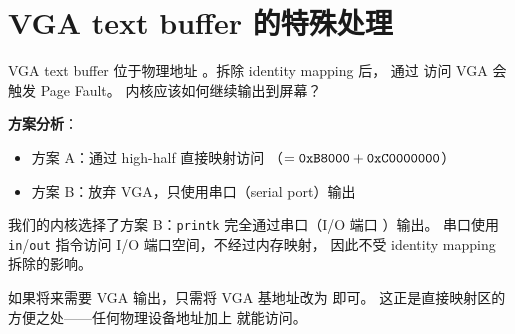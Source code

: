 \section{VGA text buffer 的特殊处理}

\begin{thinkbox}
VGA text buffer 位于物理地址 。拆除 identity mapping 后，
通过  访问 VGA 会触发 Page Fault。
内核应该如何继续输出到屏幕？

\textbf{方案分析}：
\begin{itemize}
  \item 方案 A：通过 high-half 直接映射访问 
        （$= \texttt{0xB8000} + \texttt{0xC0000000}$）
  \item 方案 B：放弃 VGA，只使用串口（serial port）输出
\end{itemize}

我们的内核选择了方案 B：\texttt{printk} 完全通过串口（I/O 端口 ）输出。
串口使用 \texttt{in}/\texttt{out} 指令访问 I/O 端口空间，不经过内存映射，
因此不受 identity mapping 拆除的影响。

如果将来需要 VGA 输出，只需将 VGA 基地址改为  即可。
这正是直接映射区的方便之处——任何物理设备地址加上  就能访问。
\end{thinkbox}


